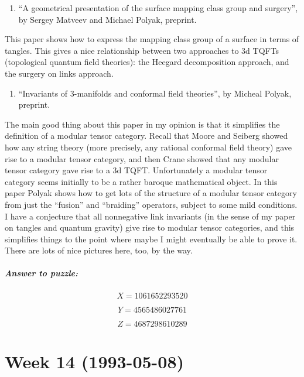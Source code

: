\documentclass{article}
\def\tightlist{}
\begin{document}
\begin{enumerate}
\def\labelenumi{\arabic{enumi})}
\setcounter{enumi}{4}
\tightlist
\item
  ``A geometrical presentation of the surface mapping class group and
  surgery'', by Sergey Matveev and Michael Polyak, preprint.
\end{enumerate}

This paper shows how to express the mapping class group of a surface in
terms of tangles. This gives a nice relationship between two approaches
to 3d TQFTs (topological quantum field theories): the Heegard
decomposition approach, and the surgery on links approach.

\begin{enumerate}
\def\labelenumi{\arabic{enumi})}
\setcounter{enumi}{5}
\tightlist
\item
  ``Invariants of 3-manifolds and conformal field theories'', by Micheal
  Polyak, preprint.
\end{enumerate}

The main good thing about this paper in my opinion is that it simplifies
the definition of a modular tensor category. Recall that Moore and
Seiberg showed how any string theory (more precisely, any rational
conformal field theory) gave rise to a modular tensor category, and then
Crane showed that any modular tensor category gave rise to a 3d TQFT.
Unfortunately a modular tensor category seems initially to be a rather
baroque mathematical object. In this paper Polyak shows how to get lots
of the structure of a modular tensor category from just the ``fusion''
and ``braiding'' operators, subject to some mild conditions. I have a
conjecture that all nonnegative link invariants (in the sense of my
paper on tangles and quantum gravity) give rise to modular tensor
categories, and this simplifies things to the point where maybe I might
eventually be able to prove it. There are lots of nice pictures here,
too, by the way.

\hypertarget{answer-to-puzzle}{%
\subparagraph{Answer to puzzle:}\label{answer-to-puzzle}}

\[X = 1061652293520\]

\[Y = 4565486027761\]

\[Z = 4687298610289\]
\hypertarget{week-14-1993-05-08}{%
\section{Week 14 (1993-05-08)}\label{week-14-1993-05-08}}
\end{document}
